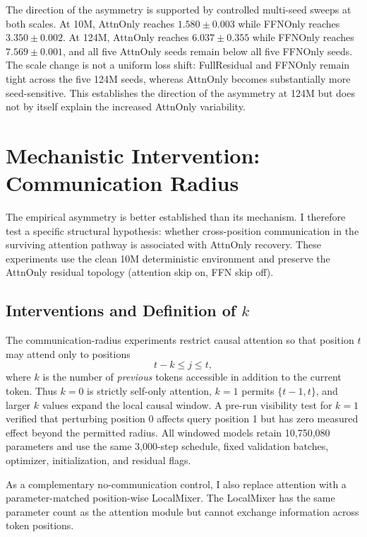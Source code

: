 \documentclass[11pt]{article}
\begin{document}
The direction of the asymmetry is supported by controlled multi-seed sweeps at both scales. At 10M, AttnOnly reaches $1.580 \pm 0.003$ while FFNOnly reaches $3.350 \pm 0.002$. At 124M, AttnOnly reaches $6.037 \pm 0.355$ while FFNOnly reaches $7.569 \pm 0.001$, and all five AttnOnly seeds remain below all five FFNOnly seeds. The scale change is not a uniform loss shift: FullResidual and FFNOnly remain tight across the five 124M seeds, whereas AttnOnly becomes substantially more seed-sensitive. This establishes the direction of the asymmetry at 124M but does not by itself explain the increased AttnOnly variability.

\section{Mechanistic Intervention: Communication Radius}
The empirical asymmetry is better established than its mechanism. I therefore test a specific structural hypothesis: whether cross-position communication in the surviving attention pathway is associated with AttnOnly recovery. These experiments use the clean 10M deterministic environment and preserve the AttnOnly residual topology (attention skip on, FFN skip off).

\subsection{Interventions and Definition of $k$}
The communication-radius experiments restrict causal attention so that position $t$ may attend only to positions
\begin{equation}
 t-k \le j \le t,
\end{equation}
where $k$ is the number of \emph{previous} tokens accessible in addition to the current token. Thus $k=0$ is strictly self-only attention, $k=1$ permits $\{t-1,t\}$, and larger $k$ values expand the local causal window. A pre-run visibility test for $k=1$ verified that perturbing position 0 affects query position 1 but has zero measured effect beyond the permitted radius. All windowed models retain 10,750,080 parameters and use the same 3,000-step schedule, fixed validation batches, optimizer, initialization, and residual flags.

As a complementary no-communication control, I also replace attention with a parameter-matched position-wise LocalMixer. The LocalMixer has the same parameter count as the attention module but cannot exchange information across token positions.
\end{document}

